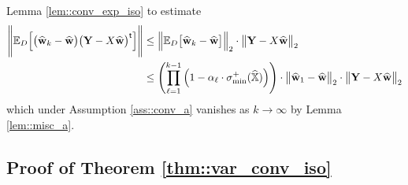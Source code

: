 \documentclass{article}
\newcommand*{\E}{\mathbb{E}} %
\newcommand*{\bbX}{\mathbb{X}}
\newcommand*{\bfY}{\mathbf{Y}}
\newcommand*{\bfw}{\mathbf{w}}
\newcommand*{\tran}{^{\mathsf{t}}}
\newcommand*{\sigminp}{\sigma_{\mathrm{min}}^+}
\DeclarePairedDelimiter{\norm}{\lVert}{\rVert}
\newcommand{\whweight}{\widehat{\bfw}}
\newcommand{\whbbX}{\widehat{\bbX}}
\begin{document}
Lemma \ref{lem::conv_exp_iso} to estimate \begin{align*}
  \norm[\Bigg]{\E_D\Big[\big(\whweight_k - \whweight\big) \big(\bfY - X
  \whweight\big)\tran\Big]} &\leq \norm[\Big]{\E_D\big[\whweight_k -
  \whweight\big]}_2 \cdot \norm[\big]{\bfY - X \whweight}_2\\
  &\leq \left(\prod_{\ell = 1}^{k - 1} \Big(1 - \alpha_\ell \cdot
  \sigminp(\whbbX)\Big)\right) \cdot \norm[\big]{\whweight_1 - \whweight}_2
  \cdot \norm[\big]{\bfY - X \whweight}_2
\end{align*} which under Assumption \ref{ass::conv_a} vanishes as $k \to \infty$
by Lemma \ref{lem::misc_a}.

\subsection{Proof of Theorem \ref{thm::var_conv_iso}}
\end{document}
